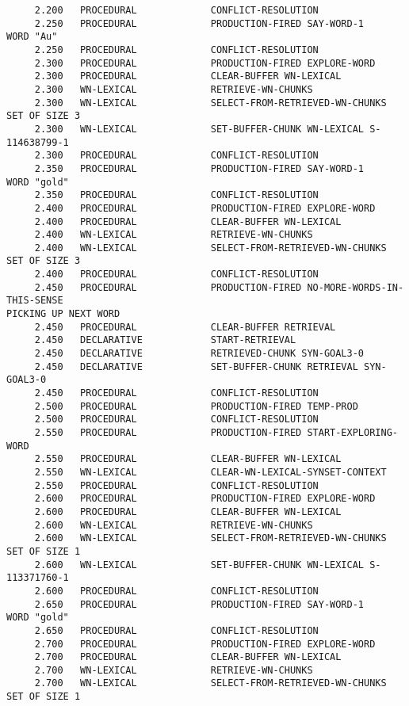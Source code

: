 \begin{verbatim}
     2.200   PROCEDURAL             CONFLICT-RESOLUTION 
     2.250   PROCEDURAL             PRODUCTION-FIRED SAY-WORD-1 
WORD "Au" 
     2.250   PROCEDURAL             CONFLICT-RESOLUTION 
     2.300   PROCEDURAL             PRODUCTION-FIRED EXPLORE-WORD 
     2.300   PROCEDURAL             CLEAR-BUFFER WN-LEXICAL 
     2.300   WN-LEXICAL             RETRIEVE-WN-CHUNKS 
     2.300   WN-LEXICAL             SELECT-FROM-RETRIEVED-WN-CHUNKS SET OF SIZE 3 
     2.300   WN-LEXICAL             SET-BUFFER-CHUNK WN-LEXICAL S-114638799-1 
     2.300   PROCEDURAL             CONFLICT-RESOLUTION 
     2.350   PROCEDURAL             PRODUCTION-FIRED SAY-WORD-1 
WORD "gold" 
     2.350   PROCEDURAL             CONFLICT-RESOLUTION 
     2.400   PROCEDURAL             PRODUCTION-FIRED EXPLORE-WORD 
     2.400   PROCEDURAL             CLEAR-BUFFER WN-LEXICAL 
     2.400   WN-LEXICAL             RETRIEVE-WN-CHUNKS 
     2.400   WN-LEXICAL             SELECT-FROM-RETRIEVED-WN-CHUNKS SET OF SIZE 3 
     2.400   PROCEDURAL             CONFLICT-RESOLUTION 
     2.450   PROCEDURAL             PRODUCTION-FIRED NO-MORE-WORDS-IN-THIS-SENSE 
PICKING UP NEXT WORD 
     2.450   PROCEDURAL             CLEAR-BUFFER RETRIEVAL 
     2.450   DECLARATIVE            START-RETRIEVAL 
     2.450   DECLARATIVE            RETRIEVED-CHUNK SYN-GOAL3-0 
     2.450   DECLARATIVE            SET-BUFFER-CHUNK RETRIEVAL SYN-GOAL3-0 
     2.450   PROCEDURAL             CONFLICT-RESOLUTION 
     2.500   PROCEDURAL             PRODUCTION-FIRED TEMP-PROD 
     2.500   PROCEDURAL             CONFLICT-RESOLUTION 
     2.550   PROCEDURAL             PRODUCTION-FIRED START-EXPLORING-WORD 
     2.550   PROCEDURAL             CLEAR-BUFFER WN-LEXICAL 
     2.550   WN-LEXICAL             CLEAR-WN-LEXICAL-SYNSET-CONTEXT 
     2.550   PROCEDURAL             CONFLICT-RESOLUTION 
     2.600   PROCEDURAL             PRODUCTION-FIRED EXPLORE-WORD 
     2.600   PROCEDURAL             CLEAR-BUFFER WN-LEXICAL 
     2.600   WN-LEXICAL             RETRIEVE-WN-CHUNKS 
     2.600   WN-LEXICAL             SELECT-FROM-RETRIEVED-WN-CHUNKS SET OF SIZE 1 
     2.600   WN-LEXICAL             SET-BUFFER-CHUNK WN-LEXICAL S-113371760-1 
     2.600   PROCEDURAL             CONFLICT-RESOLUTION 
     2.650   PROCEDURAL             PRODUCTION-FIRED SAY-WORD-1 
WORD "gold" 
     2.650   PROCEDURAL             CONFLICT-RESOLUTION 
     2.700   PROCEDURAL             PRODUCTION-FIRED EXPLORE-WORD 
     2.700   PROCEDURAL             CLEAR-BUFFER WN-LEXICAL 
     2.700   WN-LEXICAL             RETRIEVE-WN-CHUNKS 
     2.700   WN-LEXICAL             SELECT-FROM-RETRIEVED-WN-CHUNKS SET OF SIZE 1 

\end{verbatim}
